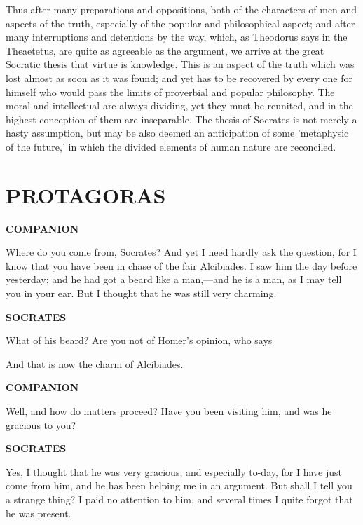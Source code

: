 \documentclass[11pt,letter]{article}
\begin{document}
\par  Thus after many preparations and oppositions, both of the characters of men and aspects of the truth, especially of the popular and philosophical aspect; and after many interruptions and detentions by the way, which, as Theodorus says in the Theaetetus, are quite as agreeable as the argument, we arrive at the great Socratic thesis that virtue is knowledge. This is an aspect of the truth which was lost almost as soon as it was found; and yet has to be recovered by every one for himself who would pass the limits of proverbial and popular philosophy. The moral and intellectual are always dividing, yet they must be reunited, and in the highest conception of them are inseparable. The thesis of Socrates is not merely a hasty assumption, but may be also deemed an anticipation of some 'metaphysic of the future,' in which the divided elements of human nature are reconciled.

\par 
\section{
      PROTAGORAS
    }  
\par \textbf{COMPANION}
\par   Where do you come from, Socrates? And yet I need hardly ask the question, for I know that you have been in chase of the fair Alcibiades. I saw him the day before yesterday; and he had got a beard like a man,—and he is a man, as I may tell you in your ear. But I thought that he was still very charming.

\par \textbf{SOCRATES}
\par   What of his beard? Are you not of Homer's opinion, who says
 
\par  And that is now the charm of Alcibiades.

\par \textbf{COMPANION}
\par   Well, and how do matters proceed? Have you been visiting him, and was he gracious to you?

\par \textbf{SOCRATES}
\par   Yes, I thought that he was very gracious; and especially to-day, for I have just come from him, and he has been helping me in an argument. But shall I tell you a strange thing? I paid no attention to him, and several times I quite forgot that he was present.
\end{document}
